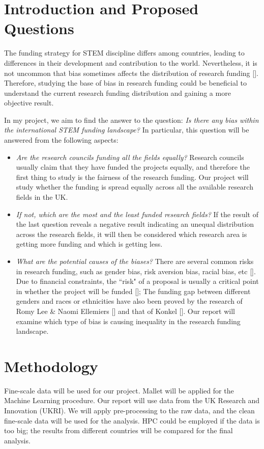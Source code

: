 \documentclass[11pt, oneside]{article}   	%
\begin{document}
\section{Introduction and Proposed Questions}

The funding strategy for STEM discipline differs among countries, leading to differences in their development and contribution to the world. Nevertheless, it is not uncommon that bias sometimes affects the distribution of research funding [\cite{crudden2022gender}]. Therefore, studying the base of bias in research funding could be beneficial to understand the current research funding distribution and gaining a more objective result.

\bigbreak
\noindent In my project, we aim to find the answer to the question: \textit{Is there any bias within the international STEM funding landscape?} In particular, this question will be answered from the following aspects:

\begin{itemize}
\item \textit{Are the research councils funding all the fields equally?}
\bigbreak
Research councils usually claim that they have funded the projects equally, and therefore the first thing to study is the fairness of the research funding. Our project will study whether the funding is spread equally across all the available research fields in the UK.
\item \textit{If not, which are the most and the least funded research fields?}
\bigbreak If the result of the last question reveals a negative result indicating an unequal distribution across the research fields, it will then be considered which research area is getting more funding and which is getting less.
\item \textit{What are the potential causes of the biases?}
\bigbreak There are several common risks in research funding, such as gender bias, risk aversion bias, racial bias, etc [\cite{wojick2015government}]. Due to financial constraints, the ``risk" of a proposal is usually a critical point in whether the project will be funded [\cite{franzoni2022funding}]; The funding gap between different genders and races or ethnicities have also been proved by the research of Romy Lee \& Naomi Ellemiers [\cite{van2015gender}] and that of Konkel [\cite{konkel2015racial}]. Our report will examine which type of bias is causing inequality in the research funding landscape.
\end{itemize}


\section{Methodology}
Fine-scale data will be used for our project. Mallet will be applied for the Machine Learning procedure. Our report will use data from the UK Research and Innovation (UKRI).
\bigbreak
\noindent We will apply pre-processing to the raw data, and the clean fine-scale data will be used for the analysis. HPC could be employed if the data is too big; the results from different countries will be compared for the final analysis.
\end{document}
